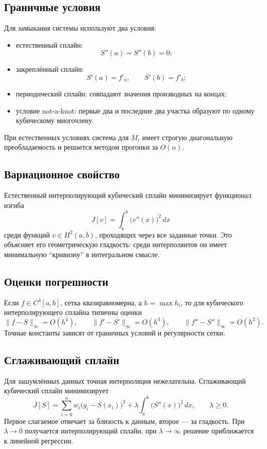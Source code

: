 \subsection{Граничные условия}

Для замыкания системы используют два условия:
\begin{itemize}
    \item естественный сплайн:
    \[
        S''(a)=S''(b)=0;
    \]
    \item закреплённый сплайн:
    \[
        S'(a)=f'_a,
        \qquad
        S'(b)=f'_b;
    \]
    \item периодический сплайн: совпадают значения производных на концах;
    \item условие not-a-knot: первые два и последние два участка образуют по
          одному кубическому многочлену.
\end{itemize}

При естественных условиях система для $M_i$ имеет строгую диагональную
преобладаемость и решается методом прогонки за $O(n)$.

\subsection{Вариационное свойство}

Естественный интерполирующий кубический сплайн минимизирует функционал изгиба
\[
    J[v]=\int_a^b\bigl(v''(x)\bigr)^2\,dx
\]
среди функций $v\in H^2(a,b)$, проходящих через все заданные точки.
Это объясняет его геометрическую гладкость: среди интерполянтов он имеет
минимальную ``кривизну'' в интегральном смысле.

\subsection{Оценки погрешности}

Если $f\in C^4[a,b]$, сетка квазиравномерна, а $h=\max h_i$, то для кубического
интерполирующего сплайна типичны оценки
\[
    \|f-S\|_{\infty}=O(h^4),
    \qquad
    \|f'-S'\|_{\infty}=O(h^3),
    \qquad
    \|f''-S''\|_{\infty}=O(h^2).
\]
Точные константы зависят от граничных условий и регулярности сетки.

\subsection{Сглаживающий сплайн}

Для зашумлённых данных точная интерполяция нежелательна. Сглаживающий кубический
сплайн минимизирует
\[
    J[S]=
    \sum_{i=0}^{n}w_i\bigl(y_i-S(x_i)\bigr)^2
    +\lambda\int_a^b\bigl(S''(x)\bigr)^2\,dx,
    \qquad \lambda\geq0.
\]
Первое слагаемое отвечает за близость к данным, второе --- за гладкость.
При $\lambda\to0$ получается интерполирующий сплайн, при
$\lambda\to\infty$ решение приближается к линейной регрессии.

